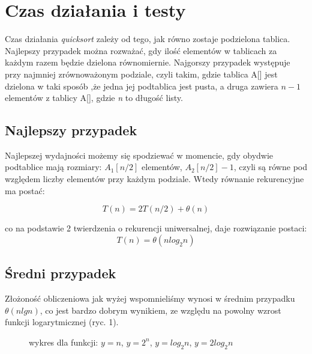 \documentclass[a4paper,11pt]{report}
\begin{document}
\chapter{Czas działania i testy}
Czas działania \textit{quicksort} zależy od tego, jak równo zostaje podzielona tablica. Najlepszy przypadek można rozważać, gdy ilość elementów w tablicach za każdym razem będzie dzielona równomiernie. 
Najgorszy przypadek występuje przy najmniej zrównoważonym podziale, czyli takim, gdzie tablica A[] jest dzielona w taki sposób ,że jedna jej podtablica jest pusta, a druga zawiera $n-1$ elementów z tablicy A[], gdzie \textit{n} to długość listy.

\section{Najlepszy przypadek}
Najlepszej wydajności możemy się spodziewać w momencie, gdy obydwie podtablice mają rozmiary: $A_{1}[n/2]$ elementów,  $A_{2}[n/2] - 1$, czyli są  równe pod względem liczby elementów przy każdym podziale. Wtedy równanie rekurencyjne ma postać:

\begin{equation*}
T(n) = 2T(n/2) + \theta(n)
\end{equation*}

co na podstawie 2 twierdzenia o rekurencji uniwersalnej, daje rozwiązanie postaci: 
\begin{equation*}
T(n) = \theta(n log_{2} n)
\end{equation*}

\section{Średni przypadek}
Złożoność obliczeniowa jak wyżej wspomnieliśmy wynosi w średnim przypadku $\theta(nlgn)$, co jest bardzo dobrym wynikiem, ze względu na powolny wzrost funkcji logarytmicznej (ryc. 1).

\begin{figure}[h!]
\centering
{}
\caption{wykres dla funkcji: $y=n$, $y=2^n$, $y=log_2n$, $y=2log_2n$}
\end{figure}
\end{document}
